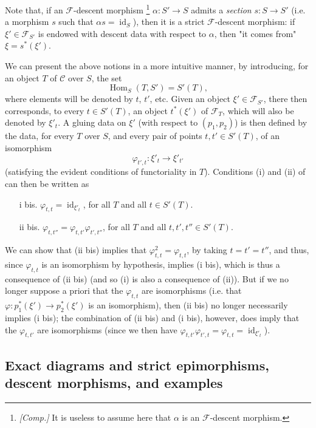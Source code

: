 Note that, if an $\mathcal{F}$-descent morphism
\footnote{\emph{[Comp.]} It is useless to assume here that $\alpha$ is an $\mathcal{F}$-descent morphism.}
$\alpha\colon S'\to S$ admits a \emph{section} $s\colon S\to S'$ (i.e. a morphism $s$ such that $\alpha s=\operatorname{id}_S$), then it is a strict $\mathcal{F}$-descent morphism:
if $\xi'\in\mathcal{F}_{S'}$ is endowed with descent data with respect to $\alpha$, then "it comes from" $\xi=s^*(\xi')$.

\label{fga3.i-a.1.d}
We can present the above notions in a more intuitive manner, by introducing, for an object $T$ of $\mathcal{C}$ over $S$, the set
\[
    \operatorname{Hom}_S(T,S') = S'(T),
\]
where elements will be denoted by $t$, $t'$, etc.
Given an object $\xi'\in\mathcal{F}_{S'}$, there then corresponds, to every $t\in S'(T)$, an object $t^*(\xi')$ of $\mathcal{F}_T$, which will also be denoted by $\xi'_t$.
A gluing data on $\xi'$ (with respect to $(p_1,p_2)$) is then defined by the data, for every $T$ over $S$, and every pair of points $t,t'\in S'(T)$, of an isomorphism
\[
    \varphi_{t',t}\colon \xi'_t \to \xi'_{t'}
\]
(satisfying the evident conditions of functoriality in $T$).
Conditions (i) and (ii) of  can then be written as

\begin{enumerate}
    \item[i bis.] $\varphi_{t,t}=\operatorname{id}_{\xi'_t}$, for all $T$ and all $t\in S'(T)$.
    \item[ii bis.] $\varphi_{t,t''}=\varphi_{t,t'}\varphi_{t',t''}$, for all $T$ and all $t,t',t''\in S'(T)$.
\end{enumerate}

We can show that (ii bis) implies that $\varphi_{t,t}^2=\varphi_{t,t}$, by taking $t=t'=t''$, and thus, since $\varphi_{t,t}$ is an isomorphism by hypothesis, implies (i bis), which is thus a consequence of (ii bis) (and so (i) is also a consequence of (ii)).
But if we no longer suppose a priori that the $\varphi_{t,t}$ are isomorphisms (i.e. that $\varphi\colon p_1^*(\xi')\to p_2^*(\xi')$ is an isomorphism), then (ii bis) no longer necessarily implies (i bis);
the combination of (ii bis) and (i bis), however, does imply that the $\varphi_{t,t'}$ are isomorphisms (since we then have $\varphi_{t,t'}\varphi_{t',t}=\varphi_{t,t}=\operatorname{id}_{\xi'_t}$).

\subsection{Exact diagrams and strict epimorphisms, descent morphisms, and examples}\label{fga3.i-a.2}

